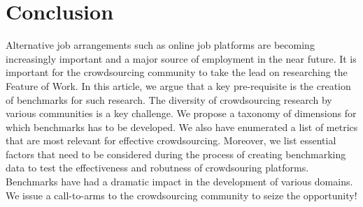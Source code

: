 \section{Conclusion}\label{sec:conclusions}
Alternative job arrangements such as online job platforms are becoming increasingly important
and a major source of employment in the near future.
It is important for the crowdsourcing community to take the lead on researching the Feature of Work.
In this article, we argue that a key pre-requisite is the creation of benchmarks for such research.
The diversity of crowdsourcing research by various communities is a key challenge.
We propose a taxonomy of dimensions for which benchmarks has to be developed.
We also have enumerated a list of metrics that are most relevant for effective crowdsourcing. Moreover, we list essential factors that need to be considered during the process of creating benchmarking data to test the effectiveness and robutness of crowdsouring platforms. Benchmarks have had a dramatic impact in the development of various domains.
We issue a call-to-arms to the crowdsourcing community to seize the opportunity!
